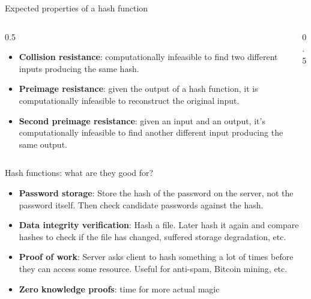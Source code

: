 \documentclass[aspectratio=169, lualatex, handout]{beamer}
\begin{document}
	\begin{frame}{Expected properties of a hash function}
		\begin{columns}[c]
			\begin{column}{0.5\textwidth}
				\begin{itemize}
					\item \textbf{Collision resistance}: computationally infeasible to find
						two different inputs producing the same hash.

					\item \textbf{Preimage resistance}: given the output of a hash function,
						it is computationally infeasible to reconstruct the original input.

					\item \textbf{Second preimage resistance}: given an input and an output,
						it's computationally infeasible to find another different input
						producing the same output.
				\end{itemize}
			\end{column}

			\begin{column}{0.5\textwidth}
			\end{column}
		\end{columns}
	\end{frame}

	\begin{frame}{Hash functions: what are they good for?}
		\begin{itemize}
			\pause

			\item \textbf{Password storage}: Store the hash of the password on the server,
				not the password itself. Then check candidate passwords against the hash.
				\pause

			\item \textbf{Data integrity verification}: Hash a file. Later hash it
				again and compare hashes to check if the file has changed, suffered storage
				degradation, etc. \pause

			\item \textbf{Proof of work}: Server asks client to hash something a lot of
				times before they can access some resource. Useful for anti-spam, Bitcoin
				mining, etc. \pause

			\item \textbf{Zero knowledge proofs}: time for more actual magic
		\end{itemize}
	\end{frame}
\end{document}

